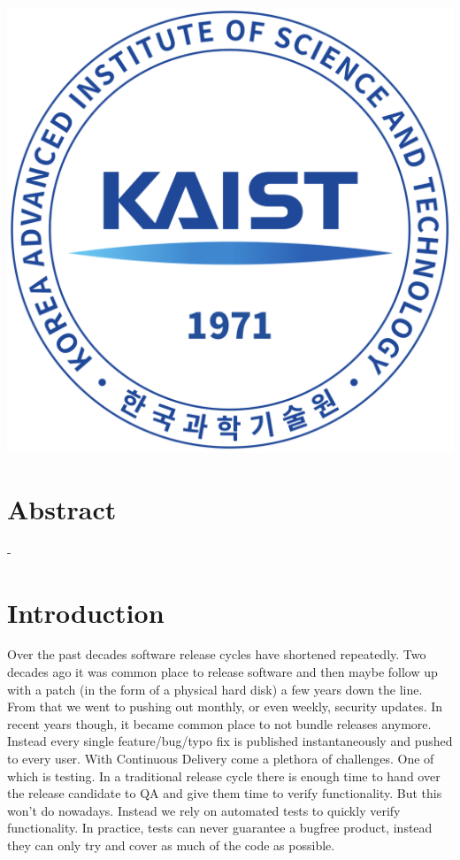 \documentclass[12pt, a4paper]{article}
\begin{document}
\begin{titlepage}
\includegraphics[scale=0.15]{KAIST.png}\\[1cm]


\vfill %
\end{titlepage}


\section*{Abstract}
-

\section{Introduction}
Over the past decades software release cycles have shortened repeatedly. Two decades ago it was common place to release software and then maybe follow up with a patch (in the form of a physical hard disk) a few years down the line. From that we went to pushing out monthly, or even weekly, security updates. In recent years though, it became common place to not bundle releases anymore. Instead every single feature/bug/typo fix is published instantaneously and pushed to every user. With Continuous Delivery come a plethora of challenges. One of which is testing. In a traditional release cycle there is enough time to hand over the release candidate to QA and give them time to verify functionality. But this won't do nowadays. Instead we rely on automated tests to quickly verify functionality. In practice, tests can never guarantee a bugfree product, instead they can only try and cover as much of the code as possible. 
\end{document}

